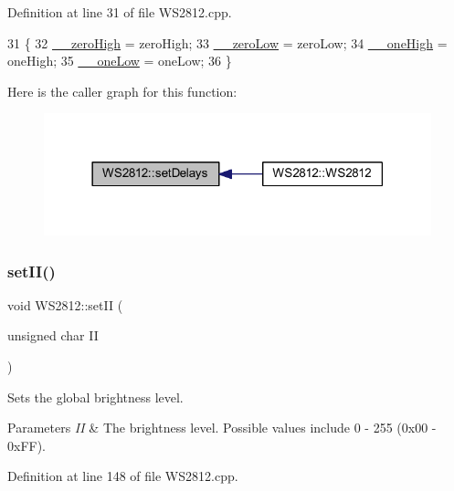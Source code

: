 Definition at line 31 of file W\+S2812.\+cpp.


\begin{DoxyCode}
31                                                                          \{
32     \hyperlink{class_w_s2812_a44dea9eca691fddccd0637af24c028d8}{\_\_zeroHigh} = zeroHigh;
33     \hyperlink{class_w_s2812_addde539bd94ea4a670420c22cace2216}{\_\_zeroLow} = zeroLow;
34     \hyperlink{class_w_s2812_acef8597fa4d4a31916a1460de124026e}{\_\_oneHigh} = oneHigh;
35     \hyperlink{class_w_s2812_ab6d118fa4ae51618675d284fc7130fdd}{\_\_oneLow} = oneLow;
36 \}
\end{DoxyCode}
Here is the caller graph for this function\+:\nopagebreak
\begin{figure}[H]
\begin{center}
\leavevmode
\includegraphics[width=318pt]{class_w_s2812_a7e1370e6fbb56daa68f1146e7b58d9ec_icgraph}
\end{center}
\end{figure}
\mbox{\label{class_w_s2812_a8b6491617f9beb271d6d5c56ba384fb6}} 
\subsubsection{\texorpdfstring{set\+I\+I()}{setII()}}
{\footnotesize\ttfamily void W\+S2812\+::set\+II (\begin{DoxyParamCaption}\item[{unsigned char}]{II }\end{DoxyParamCaption})}



Sets the global brightness level. 


\begin{DoxyParams}{Parameters}
{\em II} & The brightness level. Possible values include 0 -\/ 255 (0x00 -\/ 0x\+FF). \\
\hline
\end{DoxyParams}


Definition at line 148 of file W\+S2812.\+cpp.


